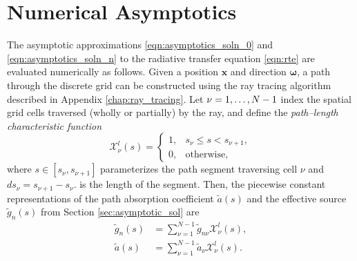 \documentclass[ms,cpyr,lof,lot]{uathesis}
\renewcommand\vec\bm
\begin{document}
\section{Numerical Asymptotics}
\label{sec:num_asymptotics}
The asymptotic approximations \eqref{eqn:asymptotics_soln_0} and \eqref{eqn:asymptotics_soln_n} to the radiative transfer equation \eqref{eqn:rte} are evaluated numerically as follows.
Given a position $\vec{x}$ and direction $\vec{\omega}$, a path through the discrete grid can be constructed using the ray tracing algorithm described in Appendix \ref{chap:ray_tracing}.
Let $\nu=1,\ldots,N\nobreak-\nobreak1$ index the spatial grid cells traversed (wholly or partially) by the ray, and define the \textit{path--length characteristic function}
\begin{equation*}
  \mathcal{X}^l_\nu(s) = \begin{cases}
    1, & s_\nu \leq s < s_{\nu+1}, \\
    0, & \mbox{otherwise},
    \end{cases}
\end{equation*}
where $s \in [s_\nu, s_{\nu+1}]$ parameterizes the path segment traversing cell $\nu$ and $ds_\nu = s_{\nu+1} - s_\nu.$ is the length of the segment.
Then, the piecewise constant representations of the path absorption coefficient $\tilde{a}(s)$ and the effective source $\tilde{g}_n(s)$ from Section \ref{sec:asymptotic_sol} are
\begin{align*}
  \tilde{g}_n(s) &= \sum_{\nu=1}^{N-1}\tilde{g}_{n\nu}\mathcal{X}^l_\nu(s), \\
  \tilde{a}(s) &= \sum_{\nu=1}^{N-1}\tilde{a}_{\nu}\mathcal{X}^l_\nu(s).
\end{align*}
\end{document}
